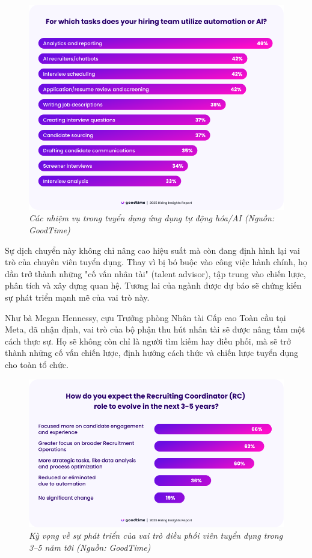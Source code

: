 \documentclass{article}
\begin{document}
\begin{figure}[H]
\centering
\includegraphics[width=1\linewidth]{img/hr-utilize-ai.png}
\caption{\centering\itshape Các nhiệm vụ trong tuyển dụng ứng dụng tự động hóa/AI (Nguồn: GoodTime)}
\label{fig:hr-utilize-ai}
\end{figure}

Sự dịch chuyển này không chỉ nâng cao hiệu suất mà còn đang định hình lại vai trò của chuyên viên tuyển dụng. Thay vì bị bó buộc vào công việc hành chính, họ dần trở thành những "cố vấn nhân tài" (talent advisor), tập trung vào chiến lược, phân tích và xây dựng quan hệ. Tương lai của ngành được dự báo sẽ chứng kiến sự phát triển mạnh mẽ của vai trò này.

Như bà Megan Hennessy, cựu Trưởng phòng Nhân tài Cấp cao Toàn cầu tại Meta, đã nhận định, vai trò của bộ phận thu hút nhân tài sẽ được nâng tầm một cách thực sự. Họ sẽ không còn chỉ là người tìm kiếm hay điều phối, mà sẽ trở thành những cố vấn chiến lược, định hướng cách thức và chiến lược tuyển dụng cho toàn tổ chức.

\begin{figure}[H]
\centering
\includegraphics[width=1\linewidth]{hiring-evolve.png}
\caption{\centering\itshape Kỳ vọng về sự phát triển của vai trò điều phối viên tuyển dụng trong 3–5 năm tới (Nguồn: GoodTime)}
\label{fig:hiring-evolve}
\end{figure}
\end{document}
